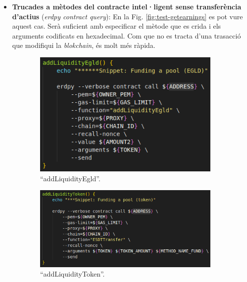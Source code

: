 \documentclass[11pt,a4paper]{article}
\begin{document}
\begin{itemize}
\begin{itemize}
	\end{itemize}
	\item \textbf{Trucades a mètodes del contracte intel·ligent sense transferència d'actius} (\textit{erdpy contract query}): En la Fig. \ref{fig:test-getearnings} es pot vure aquest cas. Serà suficient amb especificar el mètode que es crida i els arguments codificats en hexadecimal. Com que no es tracta d'una trasacció que modifiqui la \textit{blokchain}, és molt més ràpida.
\end{itemize}

\begin{figure}[!htb]
	\begin{subfigure}[b]{0.40\textwidth}
	  \includegraphics[width=\linewidth]{test-addegld.png}
	  \caption{``addLiquidityEgld''.}\label{fig:test-addegldsnip}
	\end{subfigure}\hfill
	\begin{subfigure}[b]{0.55\textwidth}
	  \includegraphics[width=\linewidth]{test-addtoken.png}
	  \caption{``addLiquidityToken''.}\label{fig:test-addtokensnip}
	\end{subfigure}\hfill
	\begin{subfigure}[b]{0.46\textwidth}

\end{subfigure}
\end{figure}
\end{document}
